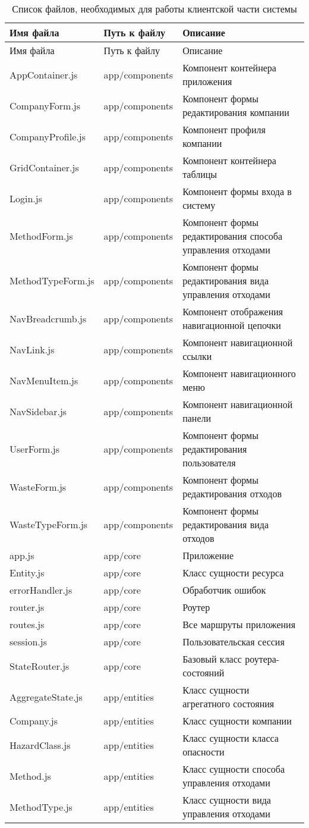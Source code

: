 \documentclass[a4paper]{G2-105}
\begin{document}
\begin{longtable}[l]{|p{4cm}|p{5cm}|p{5.7cm}|}
\caption{Список файлов, необходимых для работы клиентской части системы}
\label{tab:source_files_client}\tabularnewline
\hline
Имя файла & Путь к файлу & Описание \tabularnewline
\endfirsthead
\hline
Имя файла & Путь к файлу & Описание \tabularnewline
\endhead
\hline
AppContainer.js & app/components & Компонент контейнера приложения \tabularnewline
\hline
CompanyForm.js & app/components & Компонент формы редактирования компании \tabularnewline
\hline
CompanyProfile.js & app/components & Компонент профиля компании \tabularnewline
\hline
GridContainer.js & app/components & Компонент контейнера таблицы \tabularnewline
\hline
Login.js & app/components & Компонент формы входа в систему \tabularnewline
\hline
MethodForm.js & app/components & Компонент формы редактирования способа управления отходами \tabularnewline
\hline
MethodTypeForm.js & app/components & Компонент формы редактирования вида управления отходами \tabularnewline
\hline
NavBreadcrumb.js & app/components & Компонент отображения навигационной цепочки \tabularnewline
\hline
NavLink.js & app/components & Компонент навигационной ссылки \tabularnewline
\hline
NavMenuItem.js & app/components & Компонент навигационного меню \tabularnewline
\hline
NavSidebar.js & app/components & Компонент навигационной панели \tabularnewline
\hline
UserForm.js & app/components & Компонент формы редактирования пользователя \tabularnewline
\hline
WasteForm.js & app/components & Компонент формы редактирования отходов \tabularnewline
\hline
WasteTypeForm.js & app/components & Компонент формы редактирования вида отходов \tabularnewline
\hline
app.js & app/core & Приложение \tabularnewline
\hline
Entity.js & app/core & Класс сущности ресурса \tabularnewline
\hline
errorHandler.js & app/core & Обработчик ошибок \tabularnewline
\hline
router.js & app/core & Роутер \tabularnewline
\hline
routes.js & app/core & Все маршруты приложения \tabularnewline
\hline
session.js & app/core & Пользовательская сессия \tabularnewline
\hline
StateRouter.js & app/core & Базовый класс роутера-состояний \tabularnewline
\hline
AggregateState.js & app/entities & Класс сущности агрегатного состояния \tabularnewline
\hline
Company.js & app/entities & Класс сущности компании \tabularnewline
\hline
HazardClass.js & app/entities & Класс сущности класса опасности \tabularnewline
\hline
Method.js & app/entities & Класс сущности способа управления отходами \tabularnewline
\hline
MethodType.js & app/entities & Класс сущности вида управления отходами \tabularnewline
\hline

\end{longtable}
\end{document}
